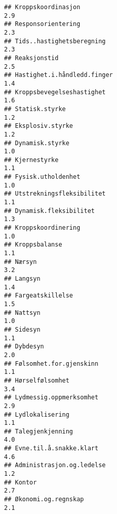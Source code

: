 \documentclass[
]{article}
\begin{document}
\begin{verbatim}
## Kroppskoordinasjon                                                               2.9
## Responsorientering                                                               2.3
## Tids..hastighetsberegning                                                        2.3
## Reaksjonstid                                                                     2.5
## Hastighet.i.håndledd.finger                                                      1.4
## Kroppsbevegelseshastighet                                                        1.6
## Statisk.styrke                                                                   1.2
## Eksplosiv.styrke                                                                 1.2
## Dynamisk.styrke                                                                  1.0
## Kjernestyrke                                                                     1.1
## Fysisk.utholdenhet                                                               1.0
## Utstrekningsfleksibilitet                                                        1.1
## Dynamisk.fleksibilitet                                                           1.3
## Kroppskoordinering                                                               1.0
## Kroppsbalanse                                                                    1.1
## Nærsyn                                                                           3.2
## Langsyn                                                                          1.4
## Fargeatskillelse                                                                 1.5
## Nattsyn                                                                          1.0
## Sidesyn                                                                          1.1
## Dybdesyn                                                                         2.0
## Følsomhet.for.gjenskinn                                                          1.1
## Hørselfølsomhet                                                                  3.4
## Lydmessig.oppmerksomhet                                                          2.9
## Lydlokalisering                                                                  1.1
## Talegjenkjenning                                                                 4.0
## Evne.til.å.snakke.klart                                                          4.6
## Administrasjon.og.ledelse                                                        1.2
## Kontor                                                                           2.7
## Økonomi.og.regnskap                                                              2.1

\end{verbatim}
\end{document}
